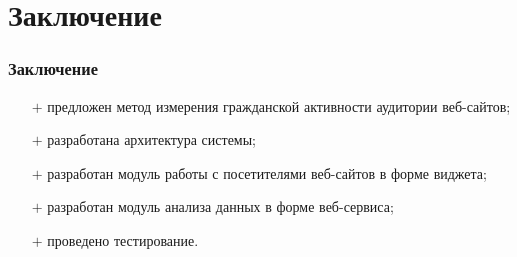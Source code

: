 \section{Заключение}
\begin{frame}
\frametitle{Заключение}
\begin{itemize}
  \item[$+$] предложен метод измерения гражданской активности аудитории веб-сайтов;
  \item[$+$] разработана архитектура системы;
  \item[$+$] разработан модуль работы с посетителями веб-сайтов в форме виджета;
  \item[$+$] разработан модуль анализа данных в форме веб-сервиса;
  \item[$+$] проведено тестирование.
\end{itemize}


\end{frame}